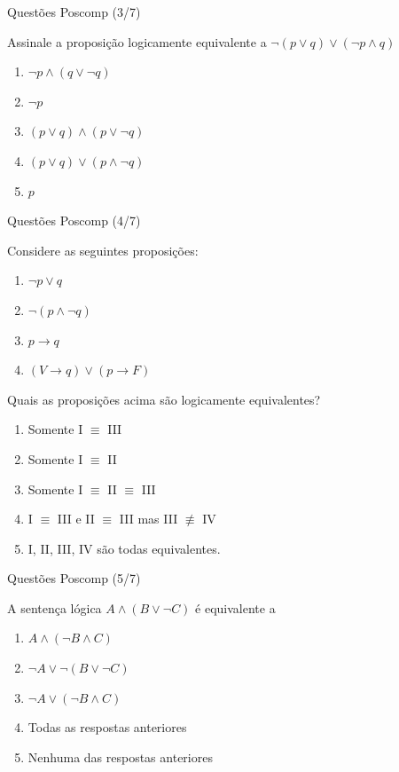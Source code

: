 \documentclass[aspectratio=169]{beamer}
\begin{document}
\begin{frame}{Questões Poscomp (3/7)}

    Assinale a proposição logicamente equivalente a
    $\lnot(p \vee q) \vee (\lnot p \wedge q)$

    \begin{enumerate}[a]
        \item $ \lnot p \wedge (q \vee \lnot q) $
        \item $ \lnot p$
        \item $ (p \vee q) \wedge (p \vee \lnot q)$
        \item $ (p \vee q) \vee (p \wedge \lnot q)$
        \item $ p $
    \end{enumerate}

\end{frame}

\begin{frame}{Questões Poscomp (4/7)}

    Considere as seguintes proposições:

    \begin{enumerate}[I]
        \item $ \lnot p \vee q$
        \item $ \lnot(p \wedge \lnot q)$
        \item $ p \rightarrow q$
        \item $(V \rightarrow q) \vee (p \rightarrow F) $
    \end{enumerate}

    Quais as proposições acima são logicamente equivalentes?

    \begin{enumerate}[a]
        \item Somente I $\equiv$ III
        \item Somente I $\equiv$ II
        \item Somente I $\equiv$ II $\equiv$ III
        \item I $\equiv$ III e II $\equiv$ III mas III $\not\equiv$ IV
        \item I, II, III, IV são todas equivalentes.
    \end{enumerate}

\end{frame}

\begin{frame}{Questões Poscomp (5/7)}

    A sentença lógica $ A \wedge (B \vee \lnot C )$ é equivalente a

    \begin{enumerate}[A]
        \item $ A \wedge (\lnot B \wedge C) $
        \item $ \lnot A \vee \lnot (B \vee \lnot C)$
        \item $ \lnot A \vee (\lnot B \wedge C)$
        \item Todas as respostas anteriores
        \item Nenhuma das respostas anteriores
    \end{enumerate}

\end{frame}
\end{document}
